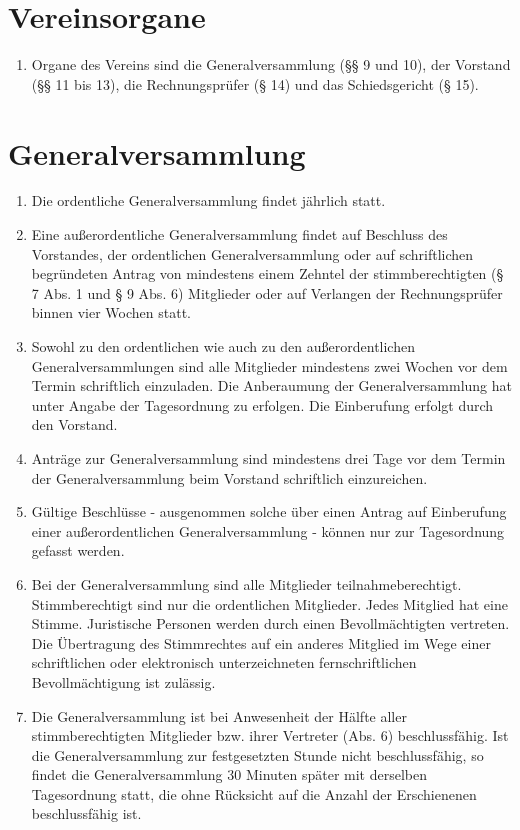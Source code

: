 \documentclass[a4paper,12pt]{article}
\begin{document}
\section{Vereinsorgane} %
\begin{enumerate}
\item Organe des Vereins sind die Generalversammlung (§§ 9 und 10), der Vorstand (§§ 11 bis 13), die Rechnungsprüfer (§ 14) und das Schiedsgericht (§ 15).
\end{enumerate}

\section{Generalversammlung} %
\begin{enumerate}
\item Die ordentliche Generalversammlung findet jährlich statt.
\item Eine außerordentliche Generalversammlung findet auf Beschluss des Vorstandes, der ordentlichen Generalversammlung oder auf schriftlichen begründeten Antrag von mindestens einem Zehntel der stimmberechtigten (§ 7 Abs. 1 und § 9 Abs. 6) Mitglieder oder auf Verlangen der Rechnungsprüfer binnen vier Wochen statt.
\item Sowohl zu den ordentlichen wie auch zu den außerordentlichen Generalversammlungen sind alle Mitglieder mindestens zwei Wochen vor dem Termin schriftlich einzuladen. Die Anberaumung der Generalversammlung hat unter Angabe der Tagesordnung zu erfolgen. Die Einberufung erfolgt durch den Vorstand.
\item Anträge zur Generalversammlung sind mindestens drei Tage vor dem Termin der Generalversammlung beim Vorstand schriftlich einzureichen.
\item Gültige Beschlüsse - ausgenommen solche über einen Antrag auf Einberufung einer außerordentlichen Generalversammlung - können nur zur Tagesordnung gefasst werden.
\item Bei der Generalversammlung sind alle Mitglieder teilnahmeberechtigt. Stimmberechtigt sind nur die ordentlichen Mitglieder. Jedes Mitglied hat eine Stimme. Juristische Personen werden durch einen Bevollmächtigten vertreten. Die Übertragung des Stimmrechtes auf ein anderes Mitglied im Wege einer schriftlichen oder elektronisch unterzeichneten fernschriftlichen Bevollmächtigung ist zulässig.
\item Die Generalversammlung ist bei Anwesenheit der Hälfte aller stimmberechtigten Mitglieder bzw. ihrer Vertreter (Abs. 6) beschlussfähig. Ist die Generalversammlung zur festgesetzten Stunde nicht beschlussfähig, so findet die Generalversammlung 30 Minuten später mit derselben Tagesordnung statt, die ohne Rücksicht auf die Anzahl der Erschienenen beschlussfähig ist.

\end{enumerate}
\end{document}
